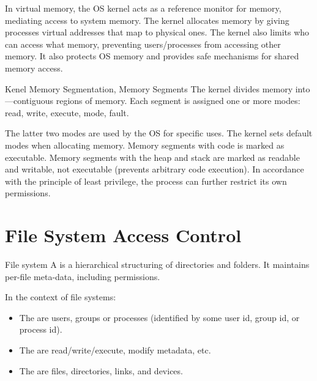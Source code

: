 \documentclass[code]{amznotes}
\begin{document}
In virtual memory, the OS kernel acts as a reference monitor for memory, mediating access to system memory. The kernel allocates memory by giving processes virtual addresses that map to physical ones. The kernel also limits who can access what memory, preventing users/processes from accessing other memory. It also protects OS memory and provides safe mechanisms for shared memory access.

\begin{dfnbox}{Kenel Memory Segmentation, Memory Segments}{}
    The kernel divides memory into ---contiguous regions of memory. Each segment is assigned one or more modes: read, write, execute, mode, fault.
\end{dfnbox}

The latter two modes are used by the OS for specific uses. The kernel sets default modes when allocating memory. Memory segments with code is marked as executable. Memory segments with the heap and stack are marked as readable and writable, not executable (prevents arbitrary code execution). In accordance with the principle of least privilege, the process can further restrict its own permissions.

\section{File System Access Control}

\begin{dfnbox}{File system}{}
    A  is a hierarchical structuring of directories and folders. It maintains per-file meta-data, including permissions.
\end{dfnbox}

In the context of file systems:
\begin{itemize}[noitemsep]
    \item The  are users, groups or processes (identified by some user id, group id, or process id).
    \item The  are read/write/execute, modify metadata, etc.
    \item The  are files, directories, links, and devices.
\end{itemize}

\end{document}
